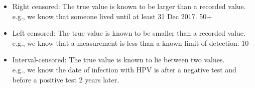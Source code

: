 \documentclass[12pt]{book}
\begin{document}
\begin{itemize}
\begin{itemize}
\item Right censored: The true value is known to be larger than a recorded value. \\
e.g., we know that someone lived until at least 31 Dec 2017. 50+
\item Left censored: The true value is known to be smaller than a recorded value. \\
e.g., we know that a measurement is less than a known limit of detection. 10-
\item Interval-censored: The true value is known to lie between two values. \\
e.g., we know the date of infection with HPV is after a negative test and before a positive test 2 years later.
\end{itemize}
\end{itemize}



\newpage

\pagestyle{fancy}
\end{document}
